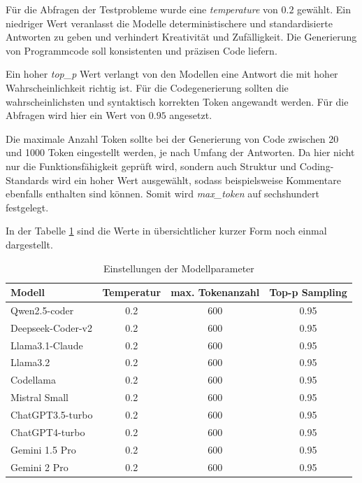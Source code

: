 Für die Abfragen der Testprobleme wurde eine \textit{temperature} von $0.2$ gewählt. Ein niedriger Wert veranlasst die Modelle deterministischere und standardisierte Antworten zu geben und verhindert Kreativität und Zufälligkeit. Die Generierung von Programmcode soll konsistenten und präzisen Code liefern.\vspace{0.2cm}

Ein hoher \textit{top\_p} Wert verlangt von den Modellen eine Antwort die mit hoher Wahrscheinlichkeit richtig ist. Für die Codegenerierung sollten die wahrscheinlichsten und syntaktisch korrekten Token angewandt werden. Für die Abfragen wird hier ein Wert von $0.95$ angesetzt.\vspace{0.2cm}

Die maximale Anzahl Token sollte bei der Generierung von Code zwischen 20 und 1000 Token eingestellt werden, je nach Umfang der Antworten. Da hier nicht nur die Funktionsfähigkeit geprüft wird, sondern auch Struktur und Coding-Standards wird ein hoher Wert ausgewählt, sodass beispielsweise Kommentare ebenfalls enthalten sind können. Somit wird \textit{max\_token} auf sechshundert festgelegt.\vspace{0.2cm}

In der Tabelle \ref{tab:params_for_llms} sind die Werte in übersichtlicher kurzer Form noch einmal dargestellt.

\begin{table}[!ht]
	\begin{tabular}{|l|c|c|c|}
		\hline
		\textbf{Modell} & \textbf{Temperatur} & \textbf{max. Tokenanzahl} & \textbf{Top-p Sampling} \\
		\hline
		Qwen2.5-coder     & 0.2 & 600 & 0.95 \\
		Deepseek-Coder-v2 & 0.2 & 600 & 0.95 \\
		Llama3.1-Claude   & 0.2 & 600 & 0.95 \\
		Llama3.2          & 0.2 & 600 & 0.95 \\
		Codellama         & 0.2 & 600 & 0.95 \\
		Mistral Small     & 0.2 & 600 & 0.95 \\
		ChatGPT3.5-turbo  & 0.2 & 600 & 0.95 \\
		ChatGPT4-turbo    & 0.2 & 600 & 0.95 \\
		Gemini 1.5 Pro    & 0.2 & 600 & 0.95 \\
		Gemini 2 Pro      & 0.2 & 600 & 0.95 \\
		\hline
	\end{tabular}
	\centering
	\caption{Einstellungen der Modellparameter}
	\label{tab:params_for_llms}
\end{table}


